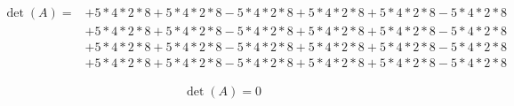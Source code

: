 \documentclass{article}
\begin{document}
\begin{align*}
  \det(A)=&+5*4*2*8+5*4*2*8-5*4*2*8+5*4*2*8+5*4*2*8-5*4*2*8\\
          &+5*4*2*8+5*4*2*8-5*4*2*8+5*4*2*8+5*4*2*8-5*4*2*8\\
          &+5*4*2*8+5*4*2*8-5*4*2*8+5*4*2*8+5*4*2*8-5*4*2*8\\
          &+5*4*2*8+5*4*2*8-5*4*2*8+5*4*2*8+5*4*2*8-5*4*2*8
\end{align*}

\begin{align*}
  \det(A)=0
\end{align*}
\end{document}
